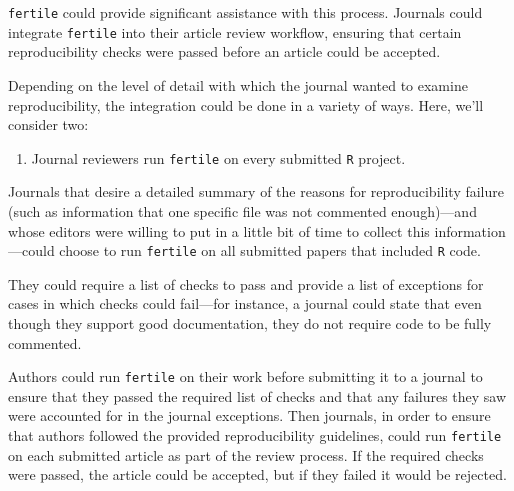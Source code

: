 \documentclass[12pt,twoside]{reedthesis}
\providecommand{\tightlist}{%
  \setlength{\itemsep}{0pt}\setlength{\parskip}{0pt}}
\begin{document}
\texttt{fertile} could provide significant assistance with this process.
Journals could integrate \texttt{fertile} into their article review
workflow, ensuring that certain reproducibility checks were passed
before an article could be accepted.

Depending on the level of detail with which the journal wanted to
examine reproducibility, the integration could be done in a variety of
ways. Here, we'll consider two:
\begin{enumerate}
\def\labelenumi{\arabic{enumi}.}
\tightlist
\item
  Journal reviewers run \texttt{fertile} on every submitted \texttt{R}
  project.
\end{enumerate}
Journals that desire a detailed summary of the reasons for
reproducibility failure (such as information that one specific file was
not commented enough)---and whose editors were willing to put in a
little bit of time to collect this information---could choose to run
\texttt{fertile} on all submitted papers that included \texttt{R} code.

They could require a list of checks to pass and provide a list of
exceptions for cases in which checks could fail---for instance, a
journal could state that even though they support good documentation,
they do not require code to be fully commented.

Authors could run \texttt{fertile} on their work before submitting it to
a journal to ensure that they passed the required list of checks and
that any failures they saw were accounted for in the journal exceptions.
Then journals, in order to ensure that authors followed the provided
reproducibility guidelines, could run \texttt{fertile} on each submitted
article as part of the review process. If the required checks were
passed, the article could be accepted, but if they failed it would be
rejected.
\end{document}
